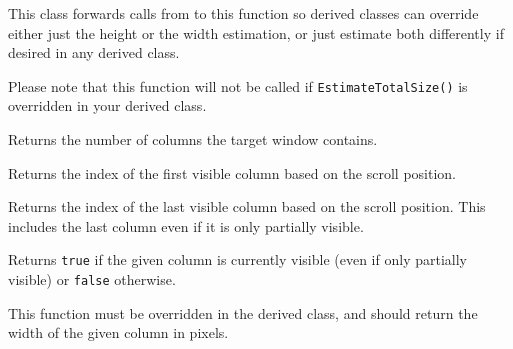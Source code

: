 This class forwards calls from
to this function so derived classes can override either just the height or
the width estimation, or just estimate both differently if desired in any
 derived class.

Please note that this function will not be called if {\tt EstimateTotalSize()}
is overridden in your derived class.


\label{wxvarhscrollhelpergetcolumncount}


Returns the number of columns the target window contains.




\label{wxvarhscrollhelpergetvisiblecolumnsbegin}


Returns the index of the first visible column based on the scroll position.


\label{wxvarhscrollhelpergetvisiblecolumnsend}


Returns the index of the last visible column based on the scroll position. This
includes the last column even if it is only partially visible.


\label{wxvarhscrollhelperiscolumnvisible}


Returns {\tt true} if the given column is currently visible (even if only
partially visible) or {\tt false} otherwise.


\label{wxvarhscrollhelperongetcolumnwidth}


This function must be overridden in the derived class, and should return the
width of the given column in pixels.


\label{wxvarhscrollhelperongetcolumnswidthhint}

